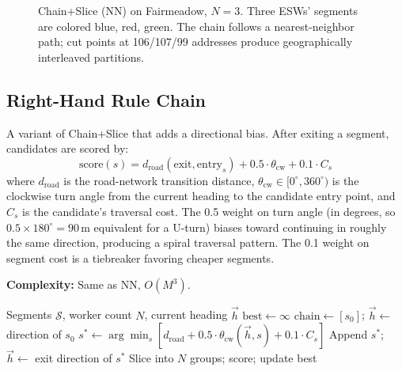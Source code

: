 \documentclass[conference]{IEEEtran}
\begin{document}
\begin{figure}[htbp]
\centering
{}
\caption{Chain+Slice (NN) on Fairmeadow, $N=3$. Three ESWs' segments are colored blue, red, green. The chain follows a nearest-neighbor path; cut points at 106/107/99 addresses produce geographically interleaved partitions.}
\end{figure}

\subsection{Right-Hand Rule Chain}

A variant of Chain+Slice that adds a directional bias. After exiting a segment, candidates are scored by:
\begin{equation}
\text{score}(s) = d_{\text{road}}(\text{exit}, \text{entry}_s) + 0.5 \cdot \theta_{\text{cw}} + 0.1 \cdot C_s
\label{eq:rh-score}
\end{equation}
where $d_{\text{road}}$ is the road-network transition distance, $\theta_{\text{cw}} \in [0^\circ, 360^\circ)$ is the clockwise turn angle from the current heading to the candidate entry point, and $C_s$ is the candidate's traversal cost. The 0.5 weight on turn angle (in degrees, so $0.5 \times 180^\circ = 90$\,m equivalent for a U-turn) biases toward continuing in roughly the same direction, producing a spiral traversal pattern. The 0.1 weight on segment cost is a tiebreaker favoring cheaper segments.

\textbf{Complexity:} Same as NN, $O(M^3)$.

\begin{algorithm}[htbp]
\caption{Right-Hand Rule Chain}
\begin{algorithmic}[1]
\REQUIRE Segments $\mathcal{S}$, worker count $N$, current heading $\vec{h}$
\STATE $\text{best} \leftarrow \infty$
    \STATE $\text{chain} \leftarrow [s_0]$; $\vec{h} \leftarrow$ direction of $s_0$
        \STATE $s^* \leftarrow \arg\min_{s} [d_{\text{road}} + 0.5 \cdot \theta_{\text{cw}}(\vec{h}, s) + 0.1 \cdot C_s]$
        \STATE Append $s^*$; $\vec{h} \leftarrow$ exit direction of $s^*$
    \ENDWHILE
    \STATE Slice into $N$ groups; score; update best
\ENDFOR
\end{algorithmic}
\end{algorithm}
\end{document}
